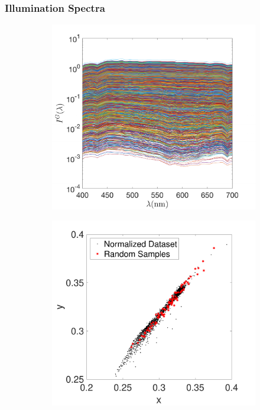 \documentclass{jov}
\begin{document}
\subsubsection{Illumination Spectra}
\begin{figure}
\centering
    \begin{subfigure}[b]{0.24 \textwidth}
    \centering
	\caption{}
        \includegraphics[width=\textwidth]{../Figures/Figure6/Figure6_a.pdf}
        \label{fig:illuminantSpectra}
    \end{subfigure}
	\begin{subfigure}[b]{0.24 \textwidth}
    \centering
        \caption{}
        \includegraphics[width=\textwidth]{../Figures/Figure6/Figure6_b.pdf}

\end{subfigure}
\end{figure}
\end{document}
